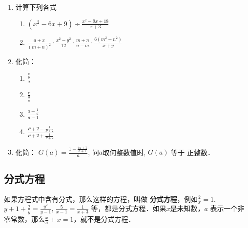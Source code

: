 \begin{ex}
\begin{enumerate} 
\item 计算下列各式
\begin{enumerate}
    \item  $\left(x^{2}-6 x+9\right) \div \frac{x^{2}-9 x+18}{x+3}$
    \item $\frac{a+x}{(m+n)^{2}} \cdot \frac{x^{2}-y^{2}}{12} \cdot \frac{m+n}{n-m} \cdot \frac{6\left(m^{2}-n^{2}\right)}{x+y}$
\end{enumerate}
\item 化简：
\begin{multicols}{2}
\begin{enumerate}
    \item $\frac{\frac{c}{b}}{a}$
    \item $\frac{c}{\frac{b}{a}}$
    \item $\frac{a-\frac{1}{a}}{a-1}$
    \item $\frac{P+2-\frac{1}{P+2}}{P+2+\frac{1}{P+2}}$
\end{enumerate}
\end{multicols}
\item 化简： $G(a)=\frac{1-\frac{4 a+1}{a+1}}{a}$, 问$a$取何整数值时, $G(a)$ 等于 正整数．
\end{enumerate}
\end{ex}

\subsection{分式方程}
如果方程式中含有分式，那么这样的方程，叫做
\textbf{分式方程}，例如$\frac{2}{x}=1$, $y+1+\frac{2}{y}=\frac{y^2}{y-1}$, $\frac{5}{x-1}=\frac{1}{x+3}$
等，都是分式方程．如果$x$是未知数，$a$
表示一个非零常数，那么$\frac{x}{a}+x=1$，就不是分式方程．

